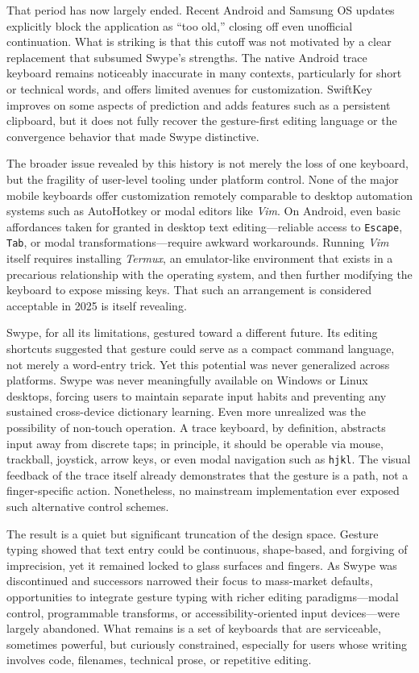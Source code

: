 \documentclass[11pt]{article}
\begin{document}
That period has now largely ended. Recent Android and Samsung OS updates explicitly block the application as ``too old,'' closing off even unofficial continuation. What is striking is that this cutoff was not motivated by a clear replacement that subsumed Swype’s strengths. The native Android trace keyboard remains noticeably inaccurate in many contexts, particularly for short or technical words, and offers limited avenues for customization. SwiftKey improves on some aspects of prediction and adds features such as a persistent clipboard, but it does not fully recover the gesture-first editing language or the convergence behavior that made Swype distinctive.

The broader issue revealed by this history is not merely the loss of one keyboard, but the fragility of user-level tooling under platform control. None of the major mobile keyboards offer customization remotely comparable to desktop automation systems such as AutoHotkey or modal editors like \textit{Vim}. On Android, even basic affordances taken for granted in desktop text editing—reliable access to \texttt{Escape}, \texttt{Tab}, or modal transformations—require awkward workarounds. Running \textit{Vim} itself requires installing \textit{Termux}, an emulator-like environment that exists in a precarious relationship with the operating system, and then further modifying the keyboard to expose missing keys. That such an arrangement is considered acceptable in 2025 is itself revealing.

Swype, for all its limitations, gestured toward a different future. Its editing shortcuts suggested that gesture could serve as a compact command language, not merely a word-entry trick. Yet this potential was never generalized across platforms. Swype was never meaningfully available on Windows or Linux desktops, forcing users to maintain separate input habits and preventing any sustained cross-device dictionary learning. Even more unrealized was the possibility of non-touch operation. A trace keyboard, by definition, abstracts input away from discrete taps; in principle, it should be operable via mouse, trackball, joystick, arrow keys, or even modal navigation such as \texttt{hjkl}. The visual feedback of the trace itself already demonstrates that the gesture is a path, not a finger-specific action. Nonetheless, no mainstream implementation ever exposed such alternative control schemes.

The result is a quiet but significant truncation of the design space. Gesture typing showed that text entry could be continuous, shape-based, and forgiving of imprecision, yet it remained locked to glass surfaces and fingers. As Swype was discontinued and successors narrowed their focus to mass-market defaults, opportunities to integrate gesture typing with richer editing paradigms—modal control, programmable transforms, or accessibility-oriented input devices—were largely abandoned. What remains is a set of keyboards that are serviceable, sometimes powerful, but curiously constrained, especially for users whose writing involves code, filenames, technical prose, or repetitive editing.
\end{document}
